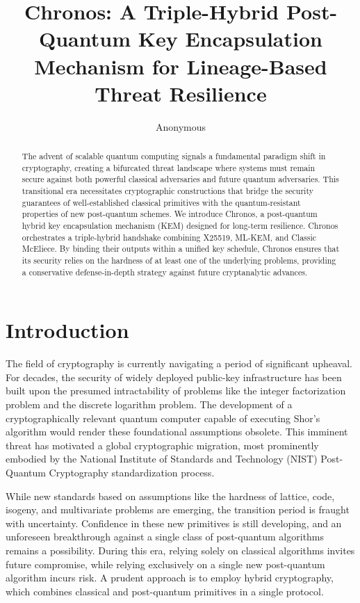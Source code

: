 \documentclass[runningheads]{llncs}
\begin{document}
\title{Chronos: A Triple-Hybrid Post-Quantum Key Encapsulation Mechanism for Lineage-Based Threat Resilience}
\author{Anonymous}
\institute{}
\maketitle

\begin{abstract}
The advent of scalable quantum computing signals a fundamental paradigm shift in cryptography, creating a bifurcated threat landscape where systems must remain secure against both powerful classical adversaries and future quantum adversaries. This transitional era necessitates cryptographic constructions that bridge the security guarantees of well-established classical primitives with the quantum-resistant properties of new post-quantum schemes. We introduce Chronos, a post-quantum hybrid key encapsulation mechanism (KEM) designed for long-term resilience. Chronos orchestrates a triple-hybrid handshake combining X25519, ML-KEM, and Classic McEliece. By binding their outputs within a unified key schedule, Chronos ensures that its security relies on the hardness of at least one of the underlying problems, providing a conservative defense-in-depth strategy against future cryptanalytic advances.
\end{abstract}

\section{Introduction}
The field of cryptography is currently navigating a period of significant upheaval. For decades, the security of widely deployed public-key infrastructure has been built upon the presumed intractability of problems like the integer factorization problem and the discrete logarithm problem. The development of a cryptographically relevant quantum computer capable of executing Shor's algorithm would render these foundational assumptions obsolete. This imminent threat has motivated a global cryptographic migration, most prominently embodied by the National Institute of Standards and Technology (NIST) Post-Quantum Cryptography standardization process.

While new standards based on assumptions like the hardness of lattice, code, isogeny, and multivariate problems are emerging, the transition period is fraught with uncertainty. Confidence in these new primitives is still developing, and an unforeseen breakthrough against a single class of post-quantum algorithms remains a possibility. During this era, relying solely on classical algorithms invites future compromise, while relying exclusively on a single new post-quantum algorithm incurs risk. A prudent approach is to employ hybrid cryptography, which combines classical and post-quantum primitives in a single protocol.
\end{document}
